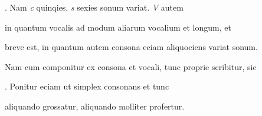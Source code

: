 . Nam \textit{c} quinqies, \textit{s} sexies sonum variat. \textit{V} autem

in quantum vocalis ad modum aliarum vocalium et longum, et

breve est, in quantum autem consona eciam aliquociens variat sonum.

Nam cum componitur ex consona et vocali, tunc proprie scribitur, sic

 . Ponitur eciam ut simplex consonans et tunc


\fullpreviouslines


{
\color{blue}


aliquando grossatur, aliquando molliter profertur.

}

